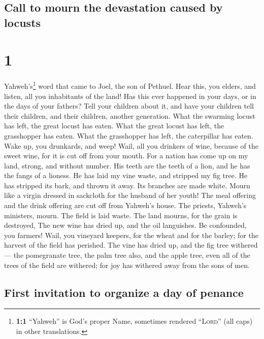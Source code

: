 \hypertarget{call-to-mourn-the-devastation-caused-by-locusts}{%
\subsection{Call to mourn the devastation caused by
locusts}\label{call-to-mourn-the-devastation-caused-by-locusts}}

\hypertarget{section}{%
\section{1}\label{section}}

 Yahweh's\footnote{\textbf{1:1} ``Yahweh'' is God's proper
  Name, sometimes rendered ``\textsc{Lord}'' (all caps) in other
  translations.} word that came to Joel, the son of Pethuel.
 Hear this, you elders, and listen, all you inhabitants of
the land! Has this ever happened in your days, or in the days of your
fathers?  Tell your children about it, and have your
children tell their children, and their children, another generation.
 What the swarming locust has left, the great locust has
eaten. What the great locust has left, the grasshopper has eaten. What
the grasshopper has left, the caterpillar has eaten.  Wake
up, you drunkards, and weep! Wail, all you drinkers of wine, because of
the sweet wine, for it is cut off from your mouth.  For a
nation has come up on my land, strong, and without number. His teeth are
the teeth of a lion, and he has the fangs of a lioness. 
He has laid my vine waste, and stripped my fig tree. He has stripped its
bark, and thrown it away. Its branches are made white. 
Mourn like a virgin dressed in sackcloth for the husband of her youth!
 The meal offering and the drink offering are cut off from
Yahweh's house. The priests, Yahweh's ministers, mourn. 
The field is laid waste. The land mourns, for the grain is destroyed,
The new wine has dried up, and the oil languishes.  Be
confounded, you farmers! Wail, you vineyard keepers, for the wheat and
for the barley; for the harvest of the field has perished.
 The vine has dried up, and the fig tree withered--- the
pomegranate tree, the palm tree also, and the apple tree, even all of
the trees of the field are withered; for joy has withered away from the
sons of men.

\hypertarget{first-invitation-to-organize-a-day-of-penance}{%
\subsection{First invitation to organize a day of
penance}\label{first-invitation-to-organize-a-day-of-penance}}

